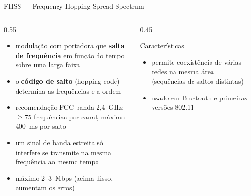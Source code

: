 \documentclass[aspectratio=169,11pt]{beamer}
\begin{document}
\begin{frame}{FHSS --- Frequency Hopping Spread Spectrum}
  \begin{columns}
    \begin{column}{0.55\textwidth}
      \begin{itemize}
        \item modulação com portadora que \textbf{salta de frequência} em função do tempo sobre uma larga faixa
        \item o \textbf{código de salto} (hopping code) determina as frequências e a ordem
        \item recomendação FCC banda 2,4~GHz: $\geq 75$ frequências por canal, máximo 400~ms por salto
        \item um sinal de banda estreita só interfere se transmite na mesma frequência ao mesmo tempo
        \item máximo 2--3~Mbps (acima disso, aumentam os erros)
      \end{itemize}
    \end{column}
    \begin{column}{0.45\textwidth}
      \begin{exampleblock}{Características}
        \begin{itemize}
          \item permite coexistência de várias redes na mesma área (sequências de saltos distintas)
          \item usado em Bluetooth e primeiras versões 802.11
        \end{itemize}
      \end{exampleblock}
      \begin{center}
      \end{center}
    \end{column}
  \end{columns}
\end{frame}
\end{document}
